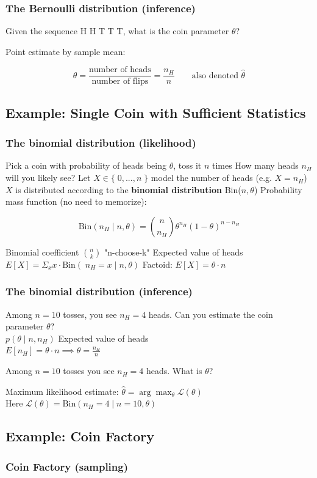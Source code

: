 \documentclass{article}
\begin{document}
	\subsubsection*{The Bernoulli distribution (inference)}
	Given the sequence H H T T T, what is the coin parameter $\theta$?
	\begin{outline}
		\1 Point estimate by sample mean:
	\end{outline}
	\[ \theta = \frac{\text{number of heads}}{\text{number of flips}} = \frac{n_H}{n} \qquad \text{also denoted } \hat{\theta} \]
	\subsection{Example: Single Coin with Sufficient Statistics}
	\subsubsection*{The binomial distribution (likelihood)}
	\begin{outline}
		\1 Pick a coin with probability of heads being $\theta$, toss it $n$ times
		\1 How many heads $n_H$ will you likely see?
		\2 Let $X \in \{\; 0, ..., n \;\}$ model the number of heads (e.g. $X = n_H$)
		\2 $X$ is distributed according to the \textbf{binomial distribution} Bin($n,\theta$)
		\2 Probability mass function (no need to memorize):
	\end{outline}
	\[ \text{Bin}(n_H \;|\; n, \theta) = \binom{n}{n_H}\theta^{n_H}(1 - \theta)^{n-n_H} \]
	\begin{outline}
		\1 Binomial coefficient $\binom{n}{k}$ "n-choose-k"
		\2 Expected value of heads $E[X] = \Sigma_x x \cdot \text{Bin}(\; n_H = x \;|\; n,\theta)$
		\2 Factoid: $E[X] = \theta \cdot n$
	\end{outline}
	\subsubsection*{The binomial distribution (inference)}
	\begin{outline}
		\1 Among $n = 10$ tosses, you see $n_H = 4$ heads.
		\1 Can you estimate the coin parameter $\theta$?\\ $p(\theta \;|\; n,n_H)$
		\1 Expected value of heads\\
		$E[n_H] = \theta \cdot n 
		\implies \theta = \frac{n_H}{n}$
	\end{outline}
	Among $n = 10$ tosses you see $n_H = 4$ heads. What is $\theta$?
	\begin{outline}
		\1 Maximum likelihood estimate: $\hat{\theta} = \arg \max_\theta \mathcal{L}(\theta)$\\
		Here $\mathcal{L}(\theta) = \text{Bin}(n_H = 4 \;|\; n = 10, \theta)$
	\end{outline}
	\subsection{Example: Coin Factory}
	\subsubsection*{Coin Factory (sampling)}
	
\end{document}
